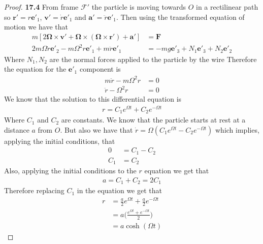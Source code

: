 \documentclass[11pt]{article}
\theoremstyle{definition}
\begin{document}
\begin{proof}{\textbf{17.4}}
    From frame $\mathcal{F}'$ the particle is moving towards $O$ in a 
    rectilinear path so $\bm r' = r \bm e'_1$, $\bm{v}' = \dot{r} \bm{e}'_1$
    and $\bm{a}' = \ddot{r} \bm{e}'_1$.
    Then using the transformed equation of motion we have that
    \begin{align*}
        m[2\bm\Omega\times\bm{v}' + \bm\Omega\times(\bm\Omega\times \bm{r}')
        + \bm{a}'] &= \bm{F}\\
        2m\Omega \dot{r}\bm e'_2 - m\Omega^2 r\bm e'_1 + m \ddot{r} \bm{e}'_1
        &= -mg\bm e'_3 + N_1\bm e'_3 + N_2\bm e'_2
    \end{align*}
    Where $N_1, N_2$ are the normal forces applied to the particle by the wire
    Therefore the equation for the $\bm e'_1$ component is
    \begin{align*}
        m \ddot{r} - m\Omega^2 r &= 0\\
        \ddot{r} - \Omega^2 r &= 0
    \end{align*}
    We know that the solution to this differential equation is
    \begin{align*}
        r = C_1 e^{\Omega t} + C_2 e^{-\Omega t}
    \end{align*}
    Where $C_1$ and $C_2$ are constants. We know that the particle starts at
    rest at a distance $a$ from $O$. 
    But also we have that $\dot{r} = \Omega(C_1 e^{\Omega t} - C_2 e^{-\Omega t})$ 
    which implies, applying the initial conditions, that
    \begin{align*}
        0 &= C_1 - C_2\\ 
        C_1 &= C_2
    \end{align*}
    Also, applying the initial conditions to the $r$ equation we get that
    \begin{align*}
        a = C_1 + C_2 = 2C_1
    \end{align*}
    Therefore replacing $C_1$ in the equation we get that
    \begin{align*}
        r &= \frac{a}{2}e^{\Omega t} + \frac{a}{2} e^{-\Omega t}\\
            &= a\bigg(\frac{e^{\Omega t} + e^{-\Omega t}}{2}\bigg)\\
            &= a\cosh(\Omega t)
    \end{align*}
\end{proof}
\end{document}
